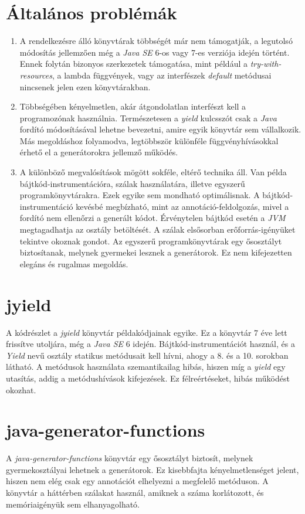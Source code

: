 \documentclass[12pt, a4paper]{article}
\begin{document}
\section{Általános problémák}
\begin{enumerate}
    \item
    A rendelkezésre álló könyvtárak többségét már nem támogatják, a legutolsó módosítás jellemzően még a \textit{Java SE} 6-os vagy 7-es verziója idején történt. Ennek folytán bizonyos szerkezetek támogatása, mint például a \textit{try-with-resources}, a lambda függvények, vagy az interfészek \textit{default} metódusai nincsenek jelen ezen könyvtárakban.
    \item
    Többségében kényelmetlen, akár átgondolatlan interfészt kell a programozónak használnia. Természetesen a \textit{yield} kulcsszót csak a \textit{Java} fordító módosításával lehetne bevezetni, amire egyik könyvtár sem vállalkozik. Más megoldáshoz folyamodva, legtöbbször különféle függvényhívásokkal érhető el a generátorokra jellemző működés.
    \item
    A különböző megvalósítások mögött sokféle, eltérő technika áll. Van példa bájtkód-instrumentációra, szálak használatára, illetve egyszerű programkönyvtárakra. Ezek egyike sem mondható optimálisnak. A bájtkód-instrumentáció kevésbé megbízható, mint az annotáció-feldolgozás, mivel a fordító nem ellenőrzi a generált kódot. Érvénytelen bájtkód esetén a \textit{JVM} megtagadhatja az osztály betöltését. A szálak elsősorban erőforrás-igényüket tekintve okoznak gondot. Az egyszerű programkönyvtárak egy ősosztályt biztosítanak, melynek gyermekei lesznek a generátorok. Ez nem kifejezetten elegáns és rugalmas megoldás.
\end{enumerate}

\section{jyield}
A kódrészlet a \textit{jyield} könyvtár példakódjainak egyike. Ez a könyvtár 7 éve lett frissítve utoljára, még a \textit{Java SE} 6 idején. Bájtkód-instrumentációt használ, és a \textit{Yield} nevű osztály statikus metódusait kell hívni, ahogy a 8. és a 10. sorokban látható. A metódusok használata szemantikailag hibás, hiszen míg a \textit{yield} egy utasítás, addig a metódushívások kifejezések. Ez félreértéseket, hibás működést okozhat.

\section{java-generator-functions}
A \textit{java-generator-functions} könyvtár egy ősosztályt biztosít, melynek gyermekosztályai lehetnek a generátorok. Ez kisebbfajta kényelmetlenséget jelent, hiszen nem elég csak egy annotációt elhelyezni a megfelelő metóduson. A könyvtár a háttérben szálakat használ, amiknek a száma korlátozott, és memóriaigényük sem elhanyagolható.
\end{document}
